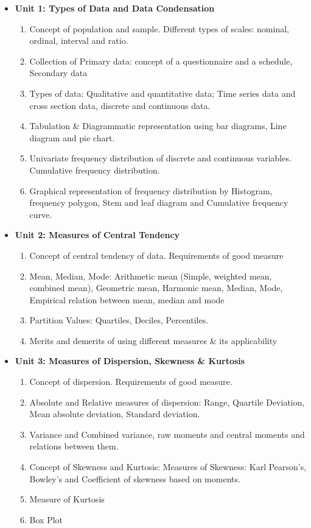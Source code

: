 \documentclass[
10pt, %
a4paper, %
]{report}
\begin{document}
\begin{itemize}
\item[] \textbf{Unit 1: Types of Data and Data Condensation}
\begin{enumerate}
\item Concept of population and sample. Different types of scales: nominal, ordinal, interval and ratio.
\item Collection of Primary data: concept of a questionnaire and a schedule, Secondary data
\item Types of data: Qualitative and quantitative data; Time series data and cross section data, discrete and continuous data.
\item Tabulation \& Diagrammatic representation using bar diagrams, Line diagram and pie chart.
\item Univariate frequency distribution of discrete and continuous variables. Cumulative frequency distribution.
\item Graphical representation of frequency distribution by Histogram, frequency polygon, Stem and leaf diagram and Cumulative frequency curve.
\end{enumerate}
\item[] \textbf{Unit 2: Measures of Central Tendency}
\begin{enumerate}
\item Concept of central tendency of data. Requirements of good measure
\item Mean, Median, Mode: Arithmetic mean (Simple, weighted mean,
combined mean), Geometric mean, Harmonic mean, Median, Mode,
Empirical relation between mean, median and mode
\item Partition Values: Quartiles, Deciles, Percentiles.
\item Merits and demerits of using different measures \& its applicability
\end{enumerate}
\item[] \textbf{Unit 3: Measures of Dispersion, Skewness \& Kurtosis}
\begin{enumerate}
\item Concept of dispersion. Requirements of good measure.
\item Absolute and Relative measures of dispersion: Range, Quartile
Deviation, Mean absolute deviation, Standard deviation.
\item Variance and Combined variance, raw moments and central moments
and relations between them.
\item Concept of Skewness and Kurtosis: Measures of Skewness: Karl
Pearson’s, Bowley’s and Coefficient of skewness based on moments.
\item Measure of Kurtosis
\item Box Plot
\end{enumerate}
\end{itemize}
\end{document}
